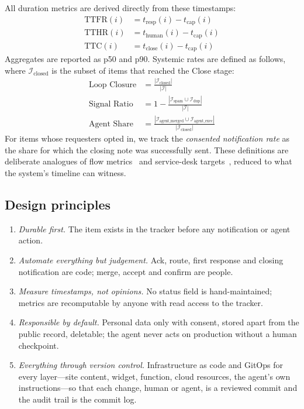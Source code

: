 All duration metrics are derived directly from these timestamps:
\begin{align}
  \text{TTFR}(i) &= t_{\text{resp}}(i) - t_{\text{cap}}(i) \\
  \text{TTHR}(i) &= t_{\text{human}}(i) - t_{\text{cap}}(i) \\
  \text{TTC}(i) &= t_{\text{close}}(i) - t_{\text{cap}}(i)
\end{align}
Aggregates are reported as p50 and p90. Systemic rates are defined as follows, where $\mathcal{I}_{\text{closed}}$ is the subset of items that reached the Close stage:
\begin{align}
  \text{Loop Closure} &= \frac{|\mathcal{I}_{\text{closed}}|}{|\mathcal{I}|} \\
  \text{Signal Ratio} &= 1 - \frac{|\mathcal{I}_{\text{spam}} \cup \mathcal{I}_{\text{dup}}|}{|\mathcal{I}|} \\
  \text{Agent Share} &= \frac{|\mathcal{I}_{\text{agent\_merged}} \cup \mathcal{I}_{\text{agent\_exec}}|}{|\mathcal{I}_{\text{closed}}|}
\end{align}
For items whose requesters opted in, we track the \emph{consented notification rate} as the share for which the closing note was successfully sent. These definitions are deliberate analogues of flow metrics~\cite{forsgren2018accelerate} and service-desk targets~\cite{axelos2019itil}, reduced to what the system's timeline can witness.

\subsection{Design principles}
\begin{enumerate}
  \item \emph{Durable first.} The item exists in the tracker before any notification or agent action.
  \item \emph{Automate everything but judgement.} Ack, route, first response and closing notification are code; merge, accept and confirm are people.
  \item \emph{Measure timestamps, not opinions.} No status field is hand-maintained; metrics are recomputable by anyone with read access to the tracker.
  \item \emph{Responsible by default.} Personal data only with consent, stored apart from the public record, deletable; the agent never acts on production without a human checkpoint.
  \item \emph{Everything through version control.} Infrastructure as code and GitOps for every layer---site content, widget, function, cloud resources, the agent's own instructions---so that each change, human or agent, is a reviewed commit and the audit trail is the commit log.
\end{enumerate}
